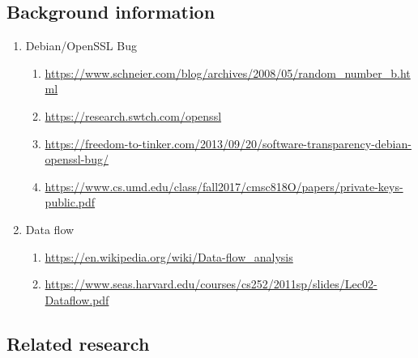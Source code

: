 \documentclass[letterpaper,twocolumn,10pt]{article}
\begin{document}
\subsection{Background information}

\begin{enumerate}
	\item Debian/OpenSSL Bug 
		\begin{enumerate}
			\item \url{https://www.schneier.com/blog/archives/2008/05/random_number_b.html}
			\item \url{https://research.swtch.com/openssl}
			\item \url{https://freedom-to-tinker.com/2013/09/20/software-transparency-debian-openssl-bug/}
			\item \url{https://www.cs.umd.edu/class/fall2017/cmsc818O/papers/private-keys-public.pdf}
		\end{enumerate}
	\item Data flow
		\begin{enumerate}
			\item \url{https://en.wikipedia.org/wiki/Data-flow_analysis}
			\item \url{https://www.seas.harvard.edu/courses/cs252/2011sp/slides/Lec02-Dataflow.pdf}
		\end{enumerate}

\end{enumerate}

\subsection{Related research}

\end{document}
